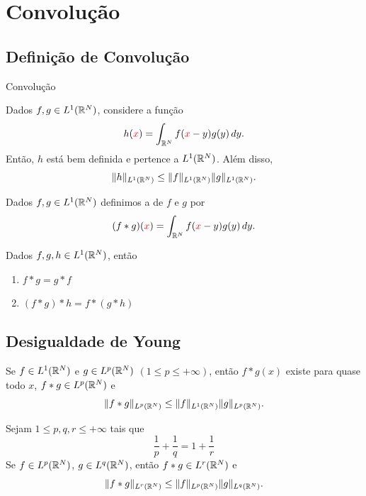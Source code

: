 \section{Convolução}


\subsection*{Definição de Convolução}
\begin{frame}{Convolução}
	\begin{prop}
		Dados $f,g\in L^1(\mathbb{R}^N)$, considere a função
		\[h({\color{red}x})=\int_{\mathbb{R}^N}f({\color{red}x}-y)g(y)\,dy.\]
		Então, $h$ está bem definida e pertence a $L^1(\mathbb{R}^N)$. Além disso, 
		\[\lVert h\rVert_{L^1(\mathbb{R}^N)}\leq \lVert f\rVert_{L^1(\mathbb{R}^N)}\lVert g\rVert_{L^1(\mathbb{R}^N)}.\]
	\end{prop}
	
\end{frame}
\begin{frame}
	\begin{defin}\label{def-conv}
		Dados $f,g\in L^1(\mathbb{R}^N)$ definimos a   de $f$ e $g$ por
		\[(f\ast g)({\color{red}x})=\int_{\mathbb{R}^N}f({\color{red}x}-y)g(y)\,dy.\]
	\end{defin}
	\begin{prop}
		Dados $f,g,h\in L^1(\mathbb{R}^N)$, então
		\begin{enumerate}
			\item 	$f\ast g=g*f$
			\item $(f\ast g)\ast h=f\ast(g\ast h)$
				\end{enumerate}
	\end{prop}

\end{frame}


\subsection*{Desigualdade de Young}
\begin{frame}
	\begin{prop}
		Se $f\in L^1(\mathbb{R}^N)$ e $g\in L^p(\mathbb{R}^N)$ $(1\leq p\leq +\infty)$, então $f\ast g(x)$ existe para quase todo $x$, $f\ast g\in L^p(\mathbb{R}^N)$ e  
		\[\lVert f\ast g\rVert_{L^p(\mathbb{R}^N)}\leq \lVert f\rVert_{L^1(\mathbb{R}^N)}\lVert g\rVert_{L^p(\mathbb{R}^N)}.\]
	\end{prop}
	
	\begin{teo}\label{teo-young}
		Sejam $1\leq p,q,r\leq +\infty$ tais que 
		\[\frac{1}{p}+\frac{1}{q}=1+\frac{1}{r}\]
		Se $f\in L^p(\mathbb{R}^N)$, $g\in L^q(\mathbb{R}^N)$, então $f\ast g\in L^r(\mathbb{R}^N)$ e 
		\[\lVert f\ast g\rVert_{L^r(\mathbb{R}^N)}\leq \lVert f\rVert_{L^p(\mathbb{R}^N)}\lVert g\rVert_{L^q(\mathbb{R}^N)}.\]
	\end{teo}
\end{frame}

